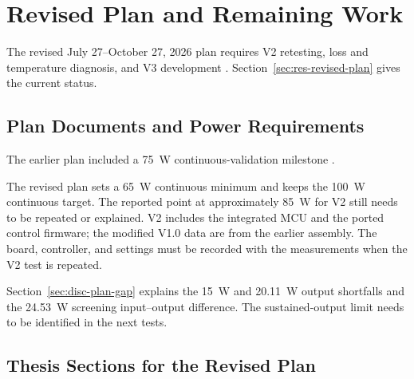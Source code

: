 \chapter{Revised Plan and Remaining Work}
\label{app:revised-plan}

The revised July 27--October 27, 2026 plan requires V2 retesting, loss and temperature diagnosis, and V3 development \cite{projectOctoberPlan}. Section~\ref{sec:res-revised-plan} gives the current status.

\section{Plan Documents and Power Requirements}

The earlier plan included a \SI{75}{\watt} continuous-validation milestone \cite{projectEarlierPlan}.

The revised plan sets a \SI{65}{\watt} continuous minimum and keeps the \SI{100}{\watt} continuous target. The reported point at approximately \SI{85}{\watt} for V2 still needs to be repeated or explained. V2 includes the integrated MCU and the ported control firmware; the modified V1.0 data are from the earlier assembly. The board, controller, and settings must be recorded with the measurements when the V2 test is repeated.

Section~\ref{sec:disc-plan-gap} explains the \SI{15}{\watt} and \SI{20.11}{\watt} output shortfalls and the \SI{24.53}{\watt} screening input--output difference. The sustained-output limit needs to be identified in the next tests.

\section{Thesis Sections for the Revised Plan}

